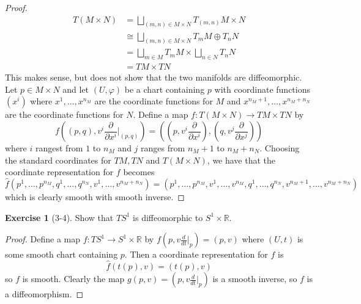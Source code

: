 \documentclass[reqno]{amsart}
\theoremstyle{plain}%
\theoremstyle{definition}
\newtheorem{exercise}[theorem]{Exercise}
\theoremstyle{remark}
\begin{document}
    \begin{proof}
        \begin{align*}
            T \left( M \times N \right) 
            &=
            \bigsqcup_{\left( m,n \right) \in M \times N}
            T_{\left( m,n \right) } M \times N\\
            &\cong \bigsqcup_{\left( m,n \right) \in M \times N}
            T_m M \oplus T_n N\\
            &= \bigsqcup_{m \in M} T_m M \times \bigsqcup_{n \in N}
            T_nN\\
            &= TM \times TN
        \end{align*}
        This makes sense, but does not show that the two manifolds are
        diffeomorphic.\\
        \linebreak
        Let $p \in M \times N$ and let
        $\left( U, \varphi \right) $ be a chart containing
        $p$ with coordinate functions $\left( x^{i} \right) $ where
        $x^{1}, \ldots, x^{n_M}$ are the coordinate functions
        for $M$ and $x^{n_M+1}, \ldots, x^{n_M+n_N}$ are the coordinate
        functions
        for $N$. 
        Define a map $f  \colon T \left( M \times N \right) \to 
        TM \times TN$ by
        \[
        f\left((p,q) , v^{i} \frac{\partial}{\partial x^{i}}|_{(p,q)} \right) 
        = \left( \left( p, v^{i} \frac{\partial}{\partial x^{i}} \right),
            \left(q,
        v^{j} \frac{\partial}{ \partial x^{j}}\right) \right)
        \] 
        where $i$ rangest from $1$ to $n_M$ and
        $j$ ranges from $n_M+1$ to $n_M+ n_N$. Choosing the standard
        coordinates for $TM, TN$ and $T \left( M \times N \right) $, we have
        that the coordinate representation for $f$ becomes
        \[
        \hat{f} \left( p^{1}, \ldots, p^{n_M}, q^{1}, \ldots, q^{n_N},
        v^{1}, \ldots, v^{n_M+ n_N}\right) 
        = \left( p^{1}, \ldots, p^{n_M}, v^{1}, \ldots, v^{n_M},
        q^{1}, \ldots, q^{n_N}, v^{n_M+1}, \ldots, v^{n_M + n_N}\right) 
        \] 
        which is clearly smooth with smooth inverse.
    \end{proof}

    \begin{exercise}[3-4]
        Show that $TS^{1}$ is diffeomorphic to $S^{1} \times \mathbb{R}$.
    \end{exercise}

    \begin{proof}
        Define a map $f  \colon TS^{1} \to S^{1} \times \mathbb{R}$ by
        $f\left( p, v \frac{d}{dt}|_p \right) =
        \left( p, v \right) $ where $\left( U, t \right) $ is some smooth chart
        containing $p$. Then a coordinate representation for $f$ is
        \[
        \hat{f}\left( t(p), v \right) = ( t(p), v)
        \] 
        so $f$ is smooth. Clearly the map
        $g\left( p, v \right) = \left( p, v \frac{d}{dt}|_p \right) $ is
        a smooth inverse, so $f$ is a diffeomorphism.
    \end{proof}
\end{document}

